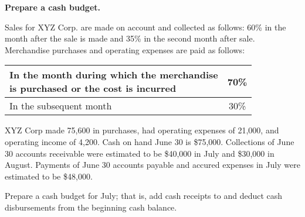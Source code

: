\documentclass{scrartcl}
\begin{document}
\vspace{10em}

\textbf{Prepare a cash budget.}

Sales for XYZ Corp. are made on account and collected as follows:
60\% in the month after the sale is made 
and 35\% in the second month after sale.
Merchandise purchases and operating expenses are paid as follows:

\medskip

\begin{tabular}{|l|c|} \hline
	\makecell{In the month during which the merchandise \\ 
	is purchased or
	the cost is incurred} & 70\% \\ \hline
	In the subsequent month & 30\% \\ \hline
\end{tabular}

\medskip

XYZ Corp made 75,600 in purchases,
had operating expenses of 21,000,
and operating income of 4,200. 
Cash on hand June 30 is \$75,000.
Collections of June 30 accounts receivable were estimated
to be \$40,000 in July and \$30,000 in August.
Payments of June 30 accounts payable and accured expenses in 
July were estimated to be \$48,000.

Prepare a cash budget for July; that is, add cash receipts to and
deduct cash disbursements from the beginning cash balance. 
\end{document}
